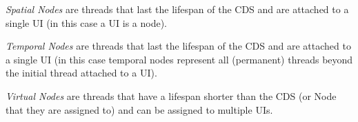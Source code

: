 \textit{Spatial Nodes} are threads that last the lifespan of the CDS and are attached to a single UI (in this case a UI is a node).

\textit{Temporal Nodes} are threads that last the lifespan of the CDS and are attached to a single UI (in this case temporal nodes represent all (permanent) threads beyond the initial thread attached to a UI).

\textit{Virtual Nodes} are threads that have a lifespan shorter than the CDS (or Node that they are assigned to) and can be assigned to multiple UIs.




